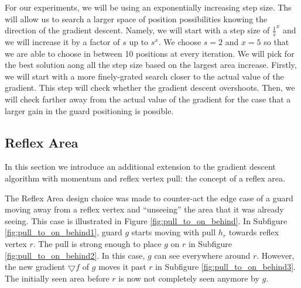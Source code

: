 For our experiments, we will be using an exponentially increasing step size. Ths will allow us to search a larger space of position possibilities knowing the direction of the gradient descent. 
Namely, we will start with a step size of $\frac 1 s^x$ and we will increase it by a factor of $s$ up to $s^x$. We choose $s = 2$ and $x = 5$ so that we are able to choose in between 10 positions at every iteration. We will pick for the best solution aong all the step size based on the largest area increase. Firstly, we will start with a more finely-grated search closer to the actual value of the gradient. This step will check whether the gradient descent overshoots. Then, we will check farther away from the actual value of the gradient for the case that a larger gain in the guard positioning is possible.

\subsection{Reflex Area}
In this section we introduce an additional extension to the gradient descent algorithm with momentum and reflex vertex pull: the concept of a reflex area. 

The Reflex Area design choice was made to counter-act the edge case of a guard moving away from a reflex vertex and ``unseeing'' the area that it was already seeing. This case is illustrated in Figure \ref{fig:pull_to_on_behind}. In Subfigure \ref{fig:pull_to_on_behind1}, guard $g$ starts moving with pull $h_r$ towards reflex vertex $r$. The pull is strong enough to place $g$ on $r$ in Subfigure \ref{fig:pull_to_on_behind2}. In this case, $g$ can see everywhere around $r$. However, the new gradient $\bigtriangledown f$ of $g$ moves it past $r$ in Subfigure \ref{fig:pull_to_on_behind3}. The initially seen area before $r$ is now not completely seen anymore by $g$.

